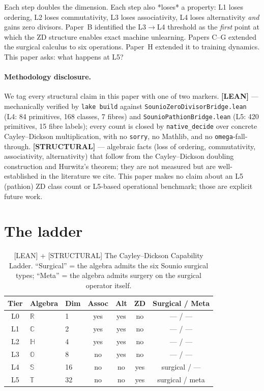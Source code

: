 \documentclass{article}
\begin{document}
Each step doubles the dimension.  Each step also *loses* a property:
L1 loses ordering, L2 loses commutativity, L3 loses associativity,
L4 loses alternativity \emph{and} gains zero divisors.  Paper~B
identified the L3$\to$L4 threshold as the \emph{first} point at
which the ZD structure enables exact machine unlearning.  Papers
C--G extended the surgical calculus to six operations.  Paper~H
extended it to training dynamics.  This paper asks: what happens at
L5?

\paragraph{Methodology disclosure.}
We tag every structural claim in this paper with one of two markers.
\textbf{[LEAN]} --- mechanically verified by \texttt{lake build} against
\texttt{SounioZeroDivisorBridge.lean} (L4: 84 primitives, 168 classes,
7 fibres) and \texttt{SounioPathionBridge.lean} (L5: 420 primitives,
15 fibre labels); every count is closed by \texttt{native\_decide} over
concrete Cayley--Dickson multiplication, with no \texttt{sorry}, no
Mathlib, and no \texttt{omega}-fall-through.
\textbf{[STRUCTURAL]} --- algebraic facts (loss of ordering, commutativity,
associativity, alternativity) that follow from the Cayley--Dickson
doubling construction and Hurwitz's theorem; they are not measured but
are well-established in the literature we cite.
This paper makes no claim about an L5 (pathion) ZD class count or L5-based
operational benchmark; those are explicit future work.

\section{The ladder}

\begin{table}[h]
  \centering
  \caption{[LEAN] + [STRUCTURAL] The Cayley--Dickson Capability Ladder.  ``Surgical'' = the
           algebra admits the six Sounio surgical types; ``Meta'' =
           the algebra admits surgery on the surgical operator
           itself.}
  \label{tbl:ladder}
  \begin{tabular}{cllcccc}
    \toprule
    Tier & Algebra      & Dim  & Assoc & Alt & ZD    & Surgical / Meta \\
    \midrule
    L0   & $\mathbb R$   & 1   & yes   & yes & no    & --- / ---        \\
    L1   & $\mathbb C$   & 2   & yes   & yes & no    & --- / ---        \\
    L2   & $\mathbb H$   & 4   & yes   & yes & no    & --- / ---        \\
    L3   & $\mathbb O$   & 8   & no    & yes & no    & --- / ---        \\
    L4   & $\mathbb S$   & 16  & no    & no  & yes   & surgical / ---   \\
    L5   & $\mathbb T$   & 32  & no    & no  & yes   & surgical / meta  \\
    \bottomrule
  \end{tabular}
\end{table}
\end{document}
